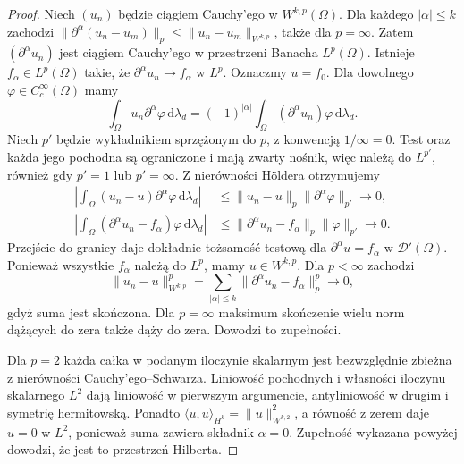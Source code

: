 \begin{proof}
Niech $(u_n)$ będzie ciągiem Cauchy'ego w $W^{k,p}(\Omega)$.
Dla każdego $|\alpha|\le k$ zachodzi
$\|\partial^\alpha(u_n-u_m)\|_p\le\|u_n-u_m\|_{W^{k,p}}$,
także dla $p=\infty$. Zatem $(\partial^\alpha u_n)$
jest ciągiem Cauchy'ego w przestrzeni Banacha $L^p(\Omega)$.
Istnieje $f_\alpha\in L^p(\Omega)$ takie, że
$\partial^\alpha u_n\to f_\alpha$ w $L^p$. Oznaczmy $u=f_0$.
Dla dowolnego $\varphi\in C_c^\infty(\Omega)$ mamy
\[
 \int_\Omega u_n\partial^\alpha\varphi\,\mathrm d\lambda_d
 =(-1)^{|\alpha|}\int_\Omega
 (\partial^\alpha u_n)\varphi\,\mathrm d\lambda_d.
\]
Niech $p'$ będzie wykładnikiem sprzężonym do $p$,
z konwencją $1/\infty=0$. Test oraz każda jego pochodna
są ograniczone i mają zwarty nośnik, więc należą do $L^{p'}$,
również gdy $p'=1$ lub $p'=\infty$. Z nierówności Höldera
otrzymujemy
\[
 \begin{aligned}
 \left|\int_\Omega(u_n-u)\partial^\alpha\varphi
 \,\mathrm d\lambda_d\right|
 &\le\|u_n-u\|_p\|\partial^\alpha\varphi\|_{p'}\to0,\\
 \left|\int_\Omega(\partial^\alpha u_n-f_\alpha)\varphi
 \,\mathrm d\lambda_d\right|
 &\le\|\partial^\alpha u_n-f_\alpha\|_p\|\varphi\|_{p'}\to0.
 \end{aligned}
\]
Przejście do granicy daje dokładnie tożsamość testową dla
$\partial^\alpha u=f_\alpha$ w $\mathcal D'(\Omega)$.
Ponieważ wszystkie $f_\alpha$ należą do $L^p$, mamy
$u\in W^{k,p}$. Dla $p<\infty$ zachodzi
\[
 \|u_n-u\|_{W^{k,p}}^p
 =\sum_{|\alpha|\le k}\|\partial^\alpha u_n-f_\alpha\|_p^p\to0,
\]
gdyż suma jest skończona. Dla $p=\infty$ maksimum skończenie
wielu norm dążących do zera także dąży do zera.
Dowodzi to zupełności.

Dla $p=2$ każda całka w podanym iloczynie skalarnym
jest bezwzględnie zbieżna z nierówności Cauchy'ego--Schwarza.
Liniowość pochodnych i własności iloczynu skalarnego $L^2$
dają liniowość w pierwszym argumencie, antyliniowość
w drugim i symetrię hermitowską. Ponadto
$\langle u,u\rangle_{H^k}=\|u\|_{W^{k,2}}^2$,
a równość z zerem daje $u=0$ w $L^2$, ponieważ suma zawiera
składnik $\alpha=0$. Zupełność wykazana powyżej
dowodzi, że jest to przestrzeń Hilberta.
\end{proof}

